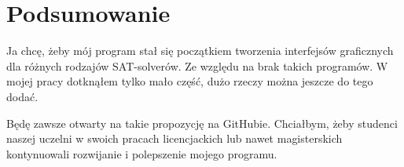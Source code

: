 \documentclass[a4paper,12pt,oneside]{book}
\theoremstyle{definition}
\begin{document}
\lipsum[1]

\lipsum[2]

\lipsum[3]

\lipsum[4]

\chapter*{Podsumowanie}

Ja chcę, żeby mój program stał się początkiem tworzenia interfejsów graficznych dla różnych rodzajów SAT-solverów. Ze względu na brak takich programów. W mojej pracy dotknąłem tylko mało część, dużo rzeczy można jeszcze do tego dodać.

Będę \cite{einstein} zawsze otwarty na takie propozycję na GitHubie. Chciałbym, żeby \cite{dirac} studenci naszej uczelni w \cite{dirac} swoich pracach licencjackich lub \cite{knuthwebsite} nawet magisterskich \cite{knuth-fa} kontynuowali rozwijanie i polepszenie mojego programu.

\listoffigures{}

\printbibliography[title=Bibliografia]
\end{document}
